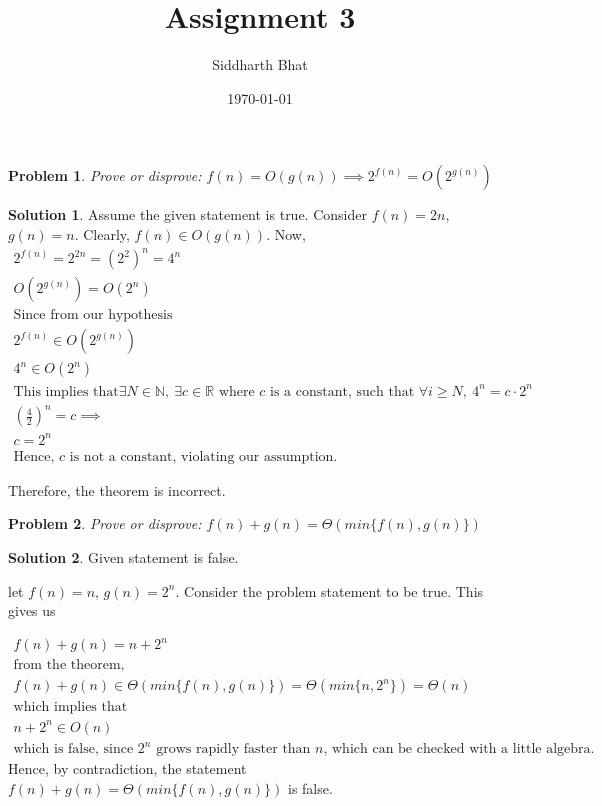 \documentclass{article}
\newtheorem{problem}{Problem}
\theoremstyle{definition}
\newtheorem*{solution}{Solution}
\begin{document}
\title{Assignment 3}
\author{Siddharth Bhat}
\date{\today}
\maketitle

\begin{problem}
    Prove or disprove: $f(n) = O(g(n)) \implies 2^{f(n)} = O(2^{g(n)})$
\end{problem}
\begin{solution}
    Assume the given statement is true. 
    Consider $f(n) = 2n$, $g(n) = n$. Clearly, $f(n) \in O(g(n))$.
    Now,
    \begin{gather*}
        2^{f(n)} = 2^{2n}= (2^2)^n = 4^n \\
        O(2^{g(n)}) = O(2^n) \\
        \text{Since from our hypothesis} \\
        2^{f(n)} \in O(2^{g(n)}) \\
        4^n \in O(2^n) \\
        \text{This implies that} \exists N \in \mathbb N,\ \exists c \in \mathbb R \text{ where $c$ is a constant, such that }
        \forall i \geq N, \ 4^n = c \cdot 2^n \\
        \left ( \frac{4}{2} \right ) ^n = c \implies \\
        c = 2^n \\
        \text{Hence, $c$ is not a constant, violating our assumption.}
    \end{gather*}

    Therefore, the theorem is incorrect.
\end{solution}

\begin{problem}
    Prove or disprove: $f(n) + g(n) = \Theta(min \{ f(n), g(n) \})$
\end{problem}
\begin{solution}
    Given statement is false.

    let $f(n) = n$, $g(n) = 2^n$. Consider the problem statement to be
    true. This gives us

    \begin{gather*}
    f(n) + g(n) = n + 2^n \\
    \text{from the theorem, } \\
    f(n) + g(n) \in \Theta(min \{ f(n), g(n) \}) = \Theta(min \{n, 2^n \}) = \Theta(n) \\
    \text{which implies that} \\
    n + 2^n \in O(n) \\
    \text{which is false, since $2^n$ grows rapidly faster than $n$, which can
    be checked with a little algebra.}
    \end{gather*}
    Hence, by contradiction, the statement $f(n) + g(n) = \Theta(min \{ f(n), g(n) \})$ is false.
\end{solution}
\end{document}
